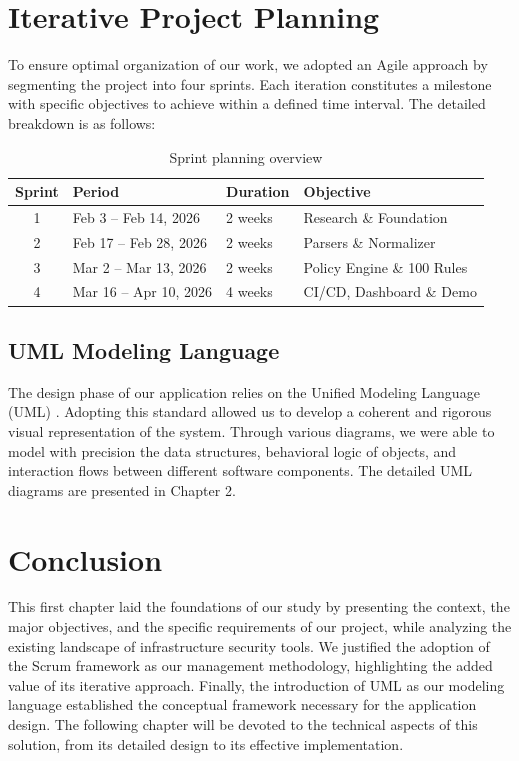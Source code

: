 \section{Iterative Project Planning}

To ensure optimal organization of our work, we adopted an Agile approach by segmenting the project into four sprints. Each iteration constitutes a milestone with specific objectives to achieve within a defined time interval. The detailed breakdown is as follows:

\begin{table}[H]
\centering
\caption{Sprint planning overview}
\label{tab:sprints}
\begin{tabular}{|c|l|l|l|}
\hline
\textbf{Sprint} & \textbf{Period} & \textbf{Duration} & \textbf{Objective} \\
\hline
1 & Feb 3 -- Feb 14, 2026 & 2 weeks & Research \& Foundation \\
\hline
2 & Feb 17 -- Feb 28, 2026 & 2 weeks & Parsers \& Normalizer \\
\hline
3 & Mar 2 -- Mar 13, 2026 & 2 weeks & Policy Engine \& 100 Rules \\
\hline
4 & Mar 16 -- Apr 10, 2026 & 4 weeks & CI/CD, Dashboard \& Demo \\
\hline
\end{tabular}
\end{table}

\subsection{UML Modeling Language}

The design phase of our application relies on the Unified Modeling Language (UML) \cite{uml}. Adopting this standard allowed us to develop a coherent and rigorous visual representation of the system. Through various diagrams, we were able to model with precision the data structures, behavioral logic of objects, and interaction flows between different software components. The detailed UML diagrams are presented in Chapter 2.

\section{Conclusion}

This first chapter laid the foundations of our study by presenting the context, the major objectives, and the specific requirements of our project, while analyzing the existing landscape of infrastructure security tools. We justified the adoption of the Scrum framework as our management methodology, highlighting the added value of its iterative approach. Finally, the introduction of UML as our modeling language established the conceptual framework necessary for the application design. The following chapter will be devoted to the technical aspects of this solution, from its detailed design to its effective implementation.
